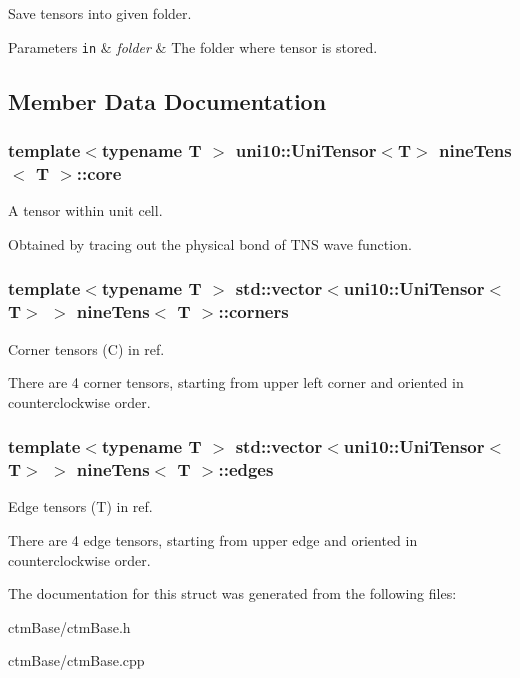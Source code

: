 Save tensors into given folder. 


\begin{DoxyParams}[1]{Parameters}
\mbox{\tt in}  & {\em folder} & The folder where tensor is stored. \\
\hline
\end{DoxyParams}


\subsection{Member Data Documentation}
\subsubsection[{\texorpdfstring{core}{core}}]{\setlength{\rightskip}{0pt plus 5cm}template$<$typename T $>$ uni10\+::\+Uni\+Tensor$<$T$>$ {\bf nine\+Tens}$<$ T $>$\+::core}\hypertarget{structnineTens_ad2611d1189bff9072e6013075f586b78}{}\label{structnineTens_ad2611d1189bff9072e6013075f586b78}


A tensor within unit cell. 

Obtained by tracing out the physical bond of T\+NS wave function. 
\subsubsection[{\texorpdfstring{corners}{corners}}]{\setlength{\rightskip}{0pt plus 5cm}template$<$typename T $>$ std\+::vector$<$uni10\+::\+Uni\+Tensor$<$T$>$ $>$ {\bf nine\+Tens}$<$ T $>$\+::corners}\hypertarget{structnineTens_ace5b2090355a7503925b0e767d836f26}{}\label{structnineTens_ace5b2090355a7503925b0e767d836f26}


Corner tensors (C) in ref. 

There are 4 corner tensors, starting from upper left corner and oriented in counterclockwise order. 
\subsubsection[{\texorpdfstring{edges}{edges}}]{\setlength{\rightskip}{0pt plus 5cm}template$<$typename T $>$ std\+::vector$<$uni10\+::\+Uni\+Tensor$<$T$>$ $>$ {\bf nine\+Tens}$<$ T $>$\+::edges}\hypertarget{structnineTens_a4e6679c9e3ca9b919d3ed95587451e74}{}\label{structnineTens_a4e6679c9e3ca9b919d3ed95587451e74}


Edge tensors (T) in ref. 

There are 4 edge tensors, starting from upper edge and oriented in counterclockwise order. 

The documentation for this struct was generated from the following files\+:\begin{DoxyCompactItemize}
\item 
ctm\+Base/ctm\+Base.\+h\item 
ctm\+Base/ctm\+Base.\+cpp\end{DoxyCompactItemize}
